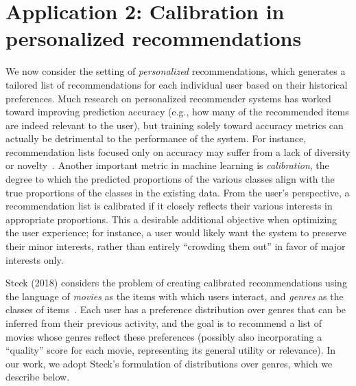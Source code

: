 
% 

\section{Application 2: Calibration in personalized recommendations}\label{sec:calibration}

We now consider the setting of \emph{personalized} recommendations, which generates a tailored list of recommendations for each individual user based on their historical preferences. Much research on personalized recommender systems has worked toward improving prediction accuracy (e.g., how many of the recommended items are indeed relevant to the user), but training solely toward accuracy metrics can actually be detrimental to the performance of the system. For instance, recommendation lists focused only on accuracy may suffer from a lack of diversity or novelty~\cite{McNee2006}. Another important metric in machine learning is \emph{calibration}, the degree to which the predicted proportions of the various classes align with the true proportions of the classes in the existing data. From the user's perspective, a recommendation list is calibrated if it closely reflects their various interests in appropriate proportions. This a desirable additional objective when optimizing the user experience; for instance, a user would likely want the system to preserve their minor interests, rather than entirely ``crowding them out'' in favor of major interests only.

Steck (2018) considers the problem of creating calibrated recommendations using the language of \emph{movies} as the items with which users interact, and \emph{genres} as the classes of items~\cite{Steck18}. Each user has a preference distribution over genres that can be inferred from their previous activity, and the goal is to recommend a list of movies whose genres reflect these preferences (possibly also incorporating a ``quality'' score for each movie, representing its general utility or relevance). In our work, we adopt Steck's formulation of distributions over genres, which we describe below.

